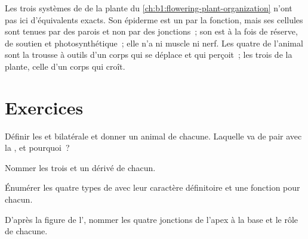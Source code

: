 \begin{remark}\label{rem:b1:body-plans-tissues:plants}
Les trois systèmes de  de la plante du
\cref{ch:b1:flowering-plant-organization} n'ont pas ici d'équivalents
exacts. Son épiderme est un  par la fonction, mais ses
cellules sont tenues par des parois et non par des jonctions~; son  est à la fois de réserve, de soutien et photosynthétique~;
elle n'a ni muscle ni nerf. Les quatre  de l'animal sont la
trousse à outils d'un corps qui se déplace et qui perçoit~; les trois de
la plante, celle d'un corps qui croît.
\end{remark}

\section{Exercices}

\begin{exercise}[$\star$]\label{exo:b1:body-plans-tissues:1}
Définir les  et bilatérale et donner un animal de
chacune. Laquelle va de pair avec la , et pourquoi~?
\end{exercise}

\begin{exercise}[$\star$]\label{exo:b1:body-plans-tissues:2}
Nommer les trois  et un  dérivé de chacun.
\end{exercise}

\begin{exercise}[$\star$]\label{exo:b1:body-plans-tissues:3}
Énumérer les quatre types de  avec leur caractère définitoire et
une fonction pour chacun.
\end{exercise}

\begin{exercise}[$\star$]\label{exo:b1:body-plans-tissues:4}
D'après la figure de l', nommer les quatre jonctions de
l'apex à la base et le rôle de chacune.
\end{exercise}

